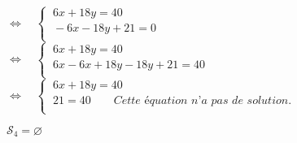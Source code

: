 \documentclass[a4paper,11pt,exos]{nsi} %
\begin{document}
\begin{enumerate}
\begin{tabbing}
                        \>  $\iff\quad \left\{
                            \begin{array}{l}
                                \ 6x+18y=40 \\
                                \ -6x-18y+21=0 \\
                        \end{array} \right.$\\[.5em]

                        \>  $\iff\quad \left\{
                            \begin{array}{l}
                                \ 6x+18y=40 \\
                                \ 6x-6x+18y-18y+21=40 \\
                        \end{array} \right.$\\[.5em]

                        \>  $\iff\quad \left\{
                            \begin{array}{l}
                                \ 6x+18y=40 \\
                                \ 21=40 \qquad \textit{Cette équation n'a pas de solution.} \\
                        \end{array} \right.$
                \end{tabbing}
                $\mathcal{S}_4=\varnothing$
\end{enumerate}
\end{document}

